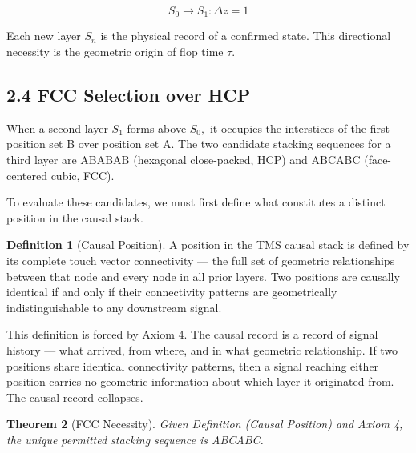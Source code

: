 \documentclass[11pt,oneside]{report}
\newtheorem{theorem}{Theorem}[section]
\theoremstyle{definition}
\newtheorem{definition}[theorem]{Definition}
\theoremstyle{remark}
\begin{document}
\begin{equation*}
S_{0} \to S_{1} : \Delta z = 1
\end{equation*}

Each new layer \ensuremath{S_{n}} is the physical record of a confirmed state. This
directional necessity is the geometric origin of flop time \ensuremath{\tau .}

\subsection*{2.4 FCC Selection over HCP}

When a second layer \ensuremath{S_{1}} forms above \ensuremath{S_{0},} it occupies the interstices of
the first --- position set B over position set A. The two candidate
stacking sequences for a third layer are ABABAB (hexagonal close-packed,
HCP) and ABCABC (face-centered cubic, FCC).

To evaluate these candidates, we must first define what constitutes a
distinct position in the causal stack.

\begin{definition}[Causal Position]
A position in the TMS causal stack is
defined by its complete touch vector connectivity --- the full set of
geometric relationships between that node and every node in all prior
layers. Two positions are causally identical if and only if their
connectivity patterns are geometrically indistinguishable to any
downstream signal.
\end{definition}

This definition is forced by Axiom 4. The causal record is a record of
signal history --- what arrived, from where, and in what geometric
relationship. If two positions share identical connectivity patterns,
then a signal reaching either position carries no geometric information
about which layer it originated from. The causal record collapses.

\begin{theorem}[FCC Necessity]
Given Definition (Causal Position) and Axiom 4,
the unique permitted stacking sequence is ABCABC.
\end{theorem}
\end{document}
